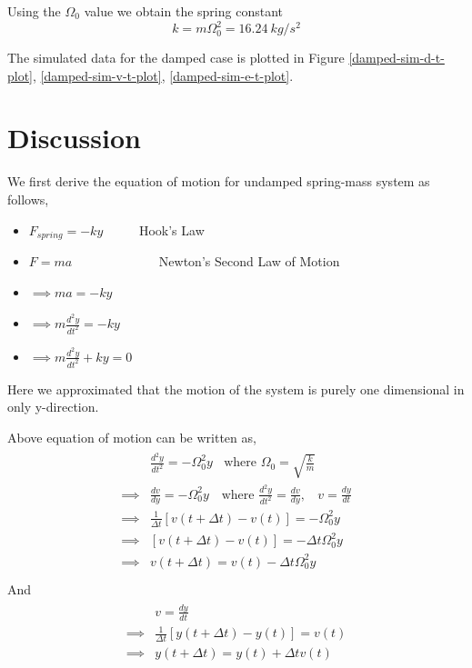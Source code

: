 \documentclass[letterpaper,12pt]{article}
\begin{document}
Using the $\Omega_0$ value we obtain the spring constant $$k = m \Omega^2_0 = 16.24\ kg/s^2$$

The simulated data for the damped case is plotted in Figure \ref{damped-sim-d-t-plot}, \ref{damped-sim-v-t-plot}, \ref{damped-sim-e-t-plot}. 

\section{Discussion}

We first derive the equation of motion for undamped spring-mass system as follows,

\begin{itemize}
  \item[] $F_{spring} = -ky$ \ \ \ \ \ Hook's Law
  \item[] $F=ma$ \ \ \ \ \ \ \ \ \ \ \ \ \ Newton's Second Law of Motion
  \item[] $\implies ma = -ky$ 
  \item[] $\implies m\frac{d^2y}{dt^2} = -ky$
  \item[] $\implies m\frac{d^2y}{dt^2} + ky = 0$
\end{itemize}

Here we approximated that the motion of the system is purely one dimensional in only y-direction.

Above equation of motion can be written as,
\begin{eqnarray*}
  \begin{split}
    &\frac{d^2y}{dt^2} = -\Omega_0^2 y \ \ \ \ \text{where } \Omega_0 = \sqrt{\frac{k}{m}} \\
    \implies &\frac{dv}{dy} = -\Omega_0^2 y \ \ \ \text{ where } \frac{d^2y}{dt^2} = \frac{dv}{dy},\ \ \ \  v = \frac{dy}{dt} \\
    \implies &\frac{1}{\Delta t} [v(t+\Delta t) - v(t)] =  -\Omega_0^2 y  \\
    \implies &[v(t+\Delta t) - v(t)] =  -\Delta t \Omega_0^2 y\\
    \implies &v(t+\Delta t) =  v(t) -\Delta t \Omega_0^2 y\\
  \end{split}
\end{eqnarray*}
And 
\begin{eqnarray*}
  \begin{split}
    &v = \frac{dy}{dt} \\
    \implies &\frac{1}{\Delta t} [y(t+\Delta t) - y(t)] =  v(t)  \\
    \implies &y(t+\Delta t) =  y(t) + \Delta t v(t)\\
  \end{split}
\end{eqnarray*}
\end{document}

